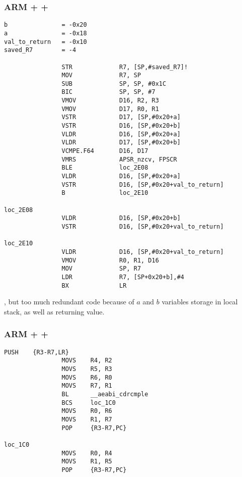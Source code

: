 \subsubsection{ARM + \NonOptimizingXcode + \ARMMode}

\begin{lstlisting}[caption=\NonOptimizingXcode + \ARMMode]
b               = -0x20
a               = -0x18
val_to_return   = -0x10
saved_R7        = -4

                STR             R7, [SP,#saved_R7]!
                MOV             R7, SP
                SUB             SP, SP, #0x1C
                BIC             SP, SP, #7
                VMOV            D16, R2, R3
                VMOV            D17, R0, R1
                VSTR            D17, [SP,#0x20+a]
                VSTR            D16, [SP,#0x20+b]
                VLDR            D16, [SP,#0x20+a]
                VLDR            D17, [SP,#0x20+b]
                VCMPE.F64       D16, D17
                VMRS            APSR_nzcv, FPSCR
                BLE             loc_2E08
                VLDR            D16, [SP,#0x20+a]
                VSTR            D16, [SP,#0x20+val_to_return]
                B               loc_2E10

loc_2E08
                VLDR            D16, [SP,#0x20+b]
                VSTR            D16, [SP,#0x20+val_to_return]

loc_2E10
                VLDR            D16, [SP,#0x20+val_to_return]
                VMOV            R0, R1, D16
                MOV             SP, R7
                LDR             R7, [SP+0x20+b],#4
                BX              LR
\end{lstlisting}

, 
{but too much redundant code because of $a$ and $b$ variables storage in local stack, as well
as returning value.}

\subsubsection{ARM + \OptimizingKeil + \ThumbMode}

\begin{lstlisting}[caption=\OptimizingKeil + \ThumbMode]
                PUSH    {R3-R7,LR}
                MOVS    R4, R2
                MOVS    R5, R3
                MOVS    R6, R0
                MOVS    R7, R1
                BL      __aeabi_cdrcmple
                BCS     loc_1C0
                MOVS    R0, R6
                MOVS    R1, R7
                POP     {R3-R7,PC}

loc_1C0
                MOVS    R0, R4
                MOVS    R1, R5
                POP     {R3-R7,PC}
\end{lstlisting}

